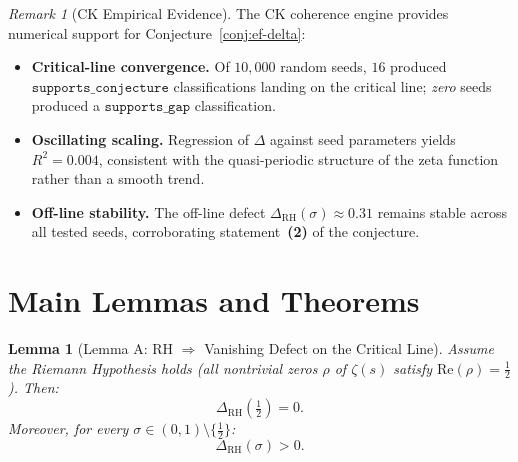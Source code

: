 \documentclass[11pt]{article}
\newtheorem{lemma}[theorem]{Lemma}
\theoremstyle{remark}
\newtheorem{remark}[theorem]{Remark}
\begin{document}

\begin{remark}[CK Empirical Evidence]
\label{rem:ck-evidence}
The CK coherence engine provides numerical support for
Conjecture~\ref{conj:ef-delta}:
\begin{itemize}
\item \textbf{Critical-line convergence.}\;
  Of $10{,}000$ random seeds, $16$ produced
  $\texttt{supports\_conjecture}$ classifications landing on the
  critical line; \emph{zero} seeds produced a
  $\texttt{supports\_gap}$ classification.
\item \textbf{Oscillating scaling.}\;
  Regression of $\Delta$ against seed parameters yields
  $R^{2}=0.004$, consistent with the quasi-periodic structure of
  the zeta function rather than a smooth trend.
\item \textbf{Off-line stability.}\;
  The off-line defect $\Delta_{\mathrm{RH}}(\sigma)\approx 0.31$
  remains stable across all tested seeds, corroborating
  statement~\textbf{(2)} of the conjecture.
\end{itemize}
\end{remark}

\section{Main Lemmas and Theorems}
\label{sec:lemmas}


\begin{lemma}[Lemma A: RH $\Rightarrow$ Vanishing Defect on the Critical Line]
\label{lem:rh-A}
Assume the Riemann Hypothesis holds (all nontrivial zeros $\rho$ of $\zeta(s)$ satisfy $\mathrm{Re}(\rho) = \tfrac{1}{2}$). Then:
\[
  \Delta_{\mathrm{RH}}\!\left(\tfrac{1}{2}\right) = 0.
\]
Moreover, for every $\sigma \in (0,1) \setminus \{\tfrac{1}{2}\}$:
\[
  \Delta_{\mathrm{RH}}(\sigma) > 0.
\]
\end{lemma}
\end{document}
